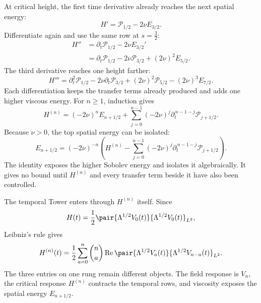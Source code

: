 At critical height, the first time derivative already reaches the next spatial energy:
\[
  H'=\mathcal P_{1/2}-2\nu E_{3/2}.
\]
Differentiate again and use the same row at \(s=\tfrac32\):
\[
\begin{aligned}
  H''
  &=\partial_t\mathcal P_{1/2}-2\nu E_{3/2}'
  \\
  &=\partial_t\mathcal P_{1/2}
  -2\nu\mathcal P_{3/2}
  +(2\nu)^2E_{5/2}.
\end{aligned}
\]
The third derivative reaches one height farther:
\[
  H'''
  =\partial_t^2\mathcal P_{1/2}
  -2\nu\partial_t\mathcal P_{3/2}
  +(2\nu)^2\mathcal P_{5/2}
  -(2\nu)^3E_{7/2}.
\]
Each differentiation keeps the transfer terms already produced and adds one higher viscous energy.
For \(n\geq1\), induction gives
\begin{equation}\label{eq:BodyCriticalHeightSpatialAscent}
  H^{(n)}
  =(-2\nu)^nE_{n+1/2}
  +\sum_{j=0}^{n-1}
  (-2\nu)^j
  \partial_t^{\,n-1-j}\mathcal P_{j+1/2}.
\end{equation}
Because \(\nu>0\), the top spatial energy can be isolated:
\begin{equation}\label{eq:BodyCompletedCriticalRow}
  E_{n+1/2}
  =(-2\nu)^{-n}
  \left(
    H^{(n)}
    -\sum_{j=0}^{n-1}
      (-2\nu)^j
      \partial_t^{\,n-1-j}\mathcal P_{j+1/2}
  \right).
\end{equation}
The identity exposes the higher Sobolev energy and isolates it algebraically.
It gives no bound until \(H^{(n)}\) and every transfer term beside it have also been controlled.

The temporal Tower enters through \(H^{(n)}\) itself.
Since
\[
  H(t)
  =\frac12
  \pair{\Lambda^{1/2}V_0(t)}
       {\Lambda^{1/2}V_0(t)}_{L^2},
\]
Leibniz's rule gives
\begin{equation}\label{eq:BodyHeightDerivativeTemporalContraction}
  H^{(n)}(t)
  =\frac12\sum_{a=0}^{n}\binom{n}{a}
  \operatorname{Re}
  \pair{\Lambda^{1/2}V_a(t)}
       {\Lambda^{1/2}V_{n-a}(t)}_{L^2}.
\end{equation}
The three entries on one rung remain different objects.
The field response is \(V_n\), the critical response \(H^{(n)}\) contracts the temporal rows, and viscosity exposes the spatial energy \(E_{n+1/2}\).

